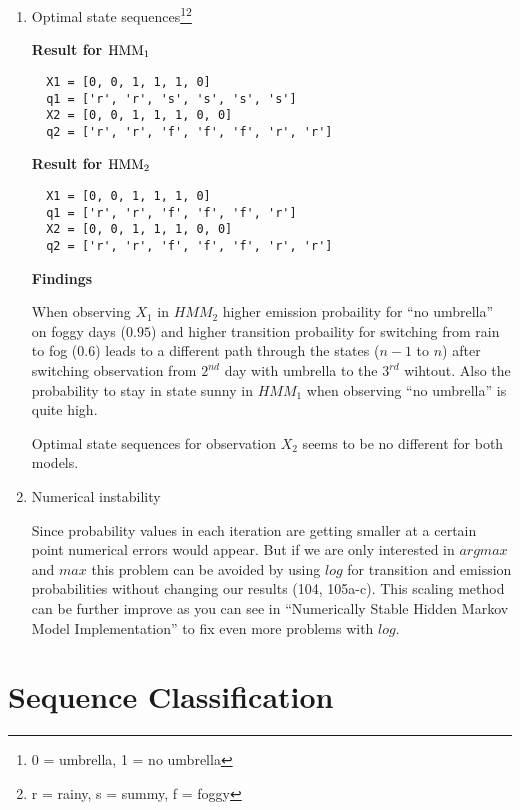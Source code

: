 \documentclass[12pt,a4paper]{article}
\begin{document}
\setcounter{enumi}{2}
\begin{enumerate}[start=2,label*={\arabic*.}]
  \item Optimal state sequences\footnote{0 = umbrella, 1 = no
  umbrella}\footnote{r = rainy, s = summy, f = foggy}
  
  \textbf{Result for $\textnormal{HMM}_1$}
  \begin{verbatim}
  X1 = [0, 0, 1, 1, 1, 0]
  q1 = ['r', 'r', 's', 's', 's', 's']
  X2 = [0, 0, 1, 1, 1, 0, 0]
  q2 = ['r', 'r', 'f', 'f', 'f', 'r', 'r']
  \end{verbatim}
  
  \textbf{Result for $\textnormal{HMM}_2$}
  \begin{verbatim}
  X1 = [0, 0, 1, 1, 1, 0]
  q1 = ['r', 'r', 'f', 'f', 'f', 'r']
  X2 = [0, 0, 1, 1, 1, 0, 0]
  q2 = ['r', 'r', 'f', 'f', 'f', 'r', 'r']
  \end{verbatim}
  
  \textbf{Findings}
  
  When observing $X_1$ in $HMM_2$ higher emission probaility for ``no umbrella''
  on foggy days ($0.95$) and higher transition probaility for switching from rain to fog
  ($0.6$) leads to a different path through the states ($n-1$ to $n$) after
  switching observation from $2^{nd}$ day with umbrella to the $3^{rd}$ wihtout.
  Also the probability to stay in state sunny in $HMM_1$ when observing ``no
  umbrella'' is quite high.
  
  Optimal state sequences for observation $X_2$ seems to be no different for
  both models.
  
  \item Numerical instability
  
  Since probability values in each iteration are getting smaller at a certain
  point numerical errors would appear. But if we are only interested in $argmax$
  and $max$ this problem can be avoided by using $log$ for transition and
  emission probabilities without changing our
  results \autocite[373]{Rabiner:1990:THM:108235.108253} (104, 105a-c). This
  scaling method can be further improve as you can see in ``Numerically Stable Hidden Markov Model
Implementation''\autocite{Mann06numericallystable} to fix even more problems
with $log$.

\end{enumerate}


\newpage
\section{Sequence Classification}
\end{document}
